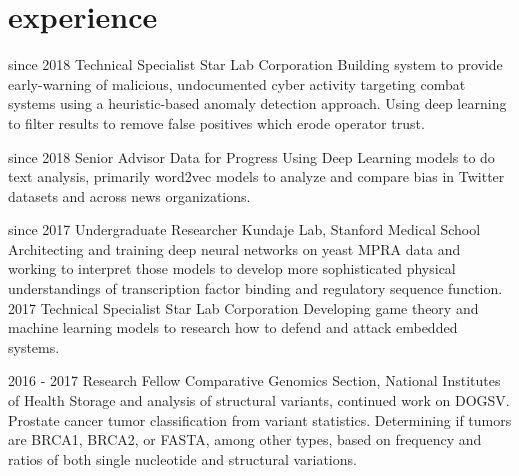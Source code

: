 \documentclass[]{cv}
\begin{document}
\section{experience}

\begin{entrylist}
   \entry
    {since 2018}
    {Technical Specialist}
    {Star Lab Corporation}
    {Building system to provide early-warning of malicious, undocumented cyber activity targeting combat systems using a heuristic-based anomaly detection approach. Using deep learning to filter results to remove false positives which erode operator trust.}
    
    
   \entry
    {since 2018}
    {Senior Advisor}
    {Data for Progress}
    {Using Deep Learning models to do text analysis, primarily word2vec models to analyze and compare bias in Twitter datasets and across news organizations.}

   \entry
    {since 2017}
    {Undergraduate Researcher}
    {Kundaje Lab, Stanford Medical School}
    {Architecting and training deep neural networks on yeast MPRA data and working to interpret those models to develop more sophisticated physical understandings of transcription factor binding and regulatory sequence function.}
  \entry
    {2017}
    {Technical Specialist}
    {Star Lab Corporation}
    {Developing game theory and machine learning models to research how to defend and attack embedded systems.}
    
  \entry
    {2016  - 2017}
    {Research Fellow}
    {Comparative Genomics Section, National Institutes of Health}
    {Storage and analysis of structural variants, continued work on DOGSV. Prostate cancer tumor classification from variant statistics. Determining if tumors are BRCA1, BRCA2, or FASTA, among other types, based on frequency and ratios of both single nucleotide and structural variations. }

\end{entrylist}
\end{document}
